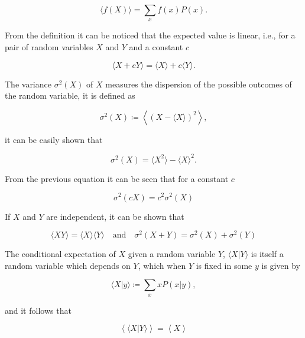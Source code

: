 \begin{equation}
  \langle f(X)\rangle = \sum_xf(x)P(x).
\end{equation}

From the definition it can be noticed that the expected value is linear, i.e., for a pair of random variables $X$ and $Y$ and a constant $c$

\begin{equation}
  \langle X+cY\rangle = \langle X\rangle+c\langle Y\rangle.
\end{equation}

The variance $\sigma^2(X)$ of $X$ measures the dispersion of the possible outcomes of the random variable, it is defined as

\begin{equation}
  \sigma^2(X) \coloneqq \left\langle\left( X-\langle X\rangle\right)^2\right\rangle,
\end{equation}

it can be easily shown that

\begin{equation}
  \sigma^2(X) = \langle X^2\rangle - \langle X\rangle^2.
\end{equation}

From the previous equation it can be seen that for a constant $c$

\begin{equation}
  \sigma^2(cX) = c^2\sigma^2(X)
\end{equation}

If $X$ and $Y$ are independent, it can be shown that

\begin{equation}
  \label {eq:con-mom_ind}
  \langle XY\rangle = \langle X\rangle\langle Y\rangle \quad\text{and}\quad \sigma^2(X+Y) = \sigma^2(X)+\sigma^2(Y)
\end{equation}

The conditional expectation of $X$ given a random variable $Y$, $\langle X|Y\rangle$ is itself a random variable which depends on $Y$, which when $Y$ is fixed in some $y$ is given by

\begin{equation}
  \langle X|y\rangle \coloneqq \sum_xxP(x|y),
\end{equation}

and it follows that

\begin{equation}
  \left\langle\langle X|Y\rangle\right\rangle = \left\langle X\right\rangle
\end{equation}


